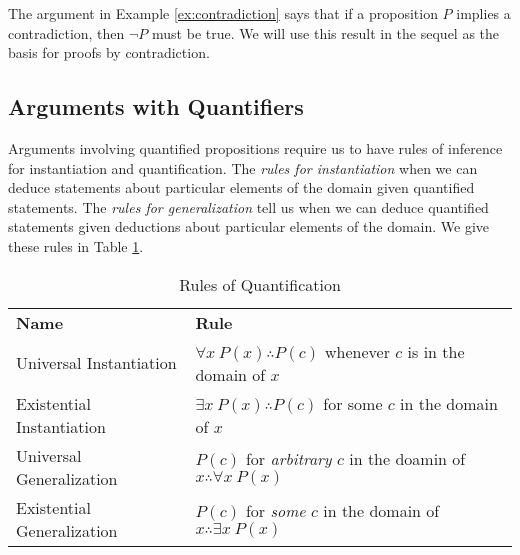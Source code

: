 The argument in Example \ref{ex:contradiction} says that if a proposition $P$ implies a contradiction, then $\neg P$ must be true. We will use this result in the sequel as the basis for proofs by contradiction.

\subsection{Arguments with Quantifiers}

Arguments involving quantified propositions require us to have rules of inference for instantiation and quantification. The \emph{rules for instantiation} when we can deduce statements about particular elements of the domain given quantified statements. The \emph{rules for generalization} 
 tell us when we can deduce quantified statements given deductions about particular elements of the domain. We give these rules in Table \ref{table:quantification}. 

{\renewcommand\arraystretch{1.2}
\begin{table}[htbp]
\centering
\caption{Rules of Quantification}
\begin{tabular}{l l}
&\\
\hline 
\bfseries Name & \bfseries Rule \\
\hline
Universal Instantiation & $\forall x\ P(x) \therefore P(c)$ whenever $c$ is in the domain of $x$\\ 
Existential Instantiation & $\exists x\ P(x) \therefore P(c)$ for some $c$ in the domain of $x$\\
\hline
Universal Generalization & $P(c)$ for \emph{arbitrary} $c$ in the doamin of $x \therefore \forall x\ P(x)$\\
Existential Generalization & $P(c)$ for \emph{some} $c$ in the domain of $x \therefore \exists x\ P(x)$\\
\end{tabular}
\label{table:quantification}
\end{table}}

